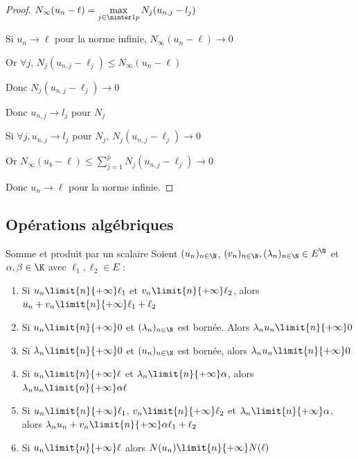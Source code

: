 \begin{proof}
    $\displaystyle N_\infty(u_n - \ell) = \max_{j \in \ninter 1 p} N_j(u_{n, j} - l_j)$

    Si $u_n \to \ell$ pour la norme infinie, $N_\infty(u_n - \ell) \to 0$

    Or $\forall j, \, N_j(u_{n, j}- \ell_j) \leqslant N_\infty(u_n - \ell)$

    Donc $N_j(u_{n, j} - \ell_j) \to 0$ 

    Donc $u_{n, j} \to l_j$ pour $N_j$

    Si $\forall j, u_{n, j} \to l_j$ pour $N_j$, $N_j(u_{n, j} - \ell_j) \to 0$

    Or $\displaystyle N_\infty(u_b - \ell) \leqslant \sum_{j = 1}^{p } N_j(u_{n, j} - \ell_j) \to 0$

    Donc $u_n \to \ell$ pour la norme infinie. 
\end{proof}



\subsection{Opérations algébriques}

\begin{proposition}{Somme et produit par un scalaire}{}
    Soient $(u_n)_{n \in \N}$, $(v_n)_{n \in \N}, (\lambda_n) _{n \in \N} \in E^{\N}$ 
    et $\alpha, \beta \in \K$ avec $\ell_1, \ell_2 \in E$ :

    \begin{enumerate}
        \item Si $u_n \limit{n}{+\infty} \ell_1$ et $v_n \limit{n}{+\infty} \ell_2$, alors 
            $u_n + v_n \limit{n}{+\infty} \ell_1 + \ell_2$ 
        \item Si $u_n \limit{n}{+\infty} 0$ et $(\lambda_n)_{n \in \N} $ est bornée. 
            Alors $\lambda_n u_n \limit{n}{+\infty} 0$
        \item Si $\lambda_n \limit{n}{+\infty} 0$ et $(u_n)_{n \in \N}$ est bornée, 
            alors $\lambda_n u_n \limit{n}{+\infty} 0$
        \item Si $u_n \limit{n}{+\infty} \ell$ et $\lambda_n \limit{n}{+\infty} \alpha$, alors
            $\lambda_n u_n \limit{n}{+\infty} \alpha \ell$
        \item Si $u_n \limit{n}{+\infty} \ell_1$, $v_n \limit{n}{+\infty} \ell_2$ 
            et $\lambda_n \limit{n}{+\infty} \alpha$, alors
            $\lambda_n u_n + v_n \limit{n}{+\infty} \alpha \ell_1 + \ell_2$
        \item Si $u_n \limit{n}{+\infty} \ell$ alors $N(u_n) \limit{n}{+\infty} N(\ell)$
    \end{enumerate}

\end{proposition}


